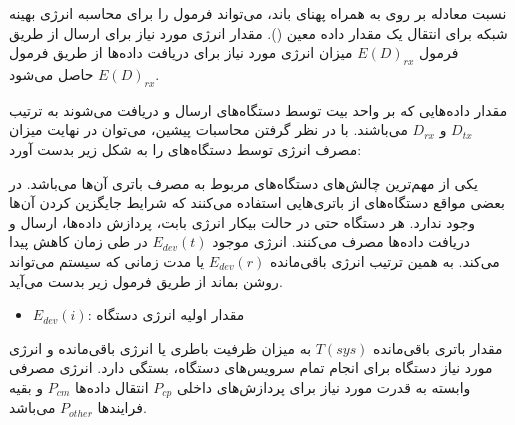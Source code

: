 \documentclass[a4paper]{article}
\begin{document}

نسبت معادله  بر روی  به همراه پهنای باند، می‌تواند فرمول
را برای محاسبه انرژی بهینه شبکه برای انتقال یک مقدار داده معین (). مقدار انرژی مورد نیاز برای ارسال از طریق فرمول $E(D)_{rx}$ میزان انرژی
مورد نیاز برای دریافت داده‌ها از طریق فرمول $E(D)_{rx}$ حاصل می‌شود.


مقدار داده‌هایی که بر واحد بیت توسط دستگاه‌های  ارسال و دریافت می‌شوند
به ترتیب $D_{tx}$ و $D_{rx}$ می‌باشند. با در نظر گرفتن محاسبات پیشین، می‌توان در
نهایت میزان مصرف انرژی توسط دستگاه‌های  را به شکل زیر بدست آورد:


یکی از مهم‌ترین چالش‌های دستگاه‌های  مربوط به مصرف باتری آن‌ها می‌باشد.
در بعضی مواقع دستگاه‌های  از باتری‌هایی استفاده می‌کنند که شرایط جایگزین
کردن آن‌ها وجود ندارد. هر دستگاه  حتی در حالت بیکار انرژی بابت، پردازش
داده‌ها، ارسال و دریافت داده‌ها مصرف می‌کنند. انرژی موجود $E_{dev}(t)$ در طی
زمان کاهش پیدا می‌کند. به همین ترتیب انرژی باقی‌مانده $E_{dev}(r)$ یا مدت زمانی
که سیستم می‌تواند روشن بماند از طریق فرمول زیر بدست می‌آید.


\begin{itemize}
    \item $E_{dev}(i)$: مقدار اولیه انرژی دستگاه
\end{itemize}

مقدار باتری باقی‌مانده $T(sys)$ به میزان ظرفیت باطری یا انرژی باقی‌مانده و انرژی
مورد نیاز دستگاه برای انجام تمام سرویس‌های دستگاه، بستگی دارد. انرژی مصرفی
وابسته به قدرت مورد نیاز برای پردازش‌های داخلی $P_{cp}$ انتقال داده‌ها $P_{cm}$
و بقیه فرایند‌ها $P_{other}$ می‌باشد.

\end{document}
